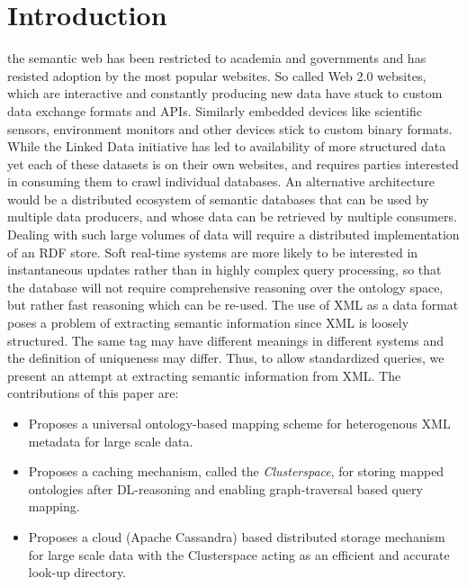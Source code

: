 \documentclass[journal]{IEEEtran}
\begin{document}
\section{Introduction}
 the semantic web has been restricted to academia
and governments and has resisted adoption by the most popular websites. So
called Web 2.0 websites, which are interactive and constantly producing new
data have stuck to custom data exchange formats and APIs. Similarly embedded
devices like scientific sensors, environment monitors and other devices stick
to custom binary formats.  While the Linked Data initiative has led to
availability of more structured data yet each of these datasets is on their own
websites, and requires parties interested in consuming them to crawl individual
databases. An alternative architecture would be a distributed ecosystem of
semantic databases that can be used by multiple data producers, and whose data
can be retrieved by multiple consumers. Dealing with such large volumes of data
will require a distributed implementation of an RDF store. Soft real-time
systems are more likely to be interested in instantaneous updates rather than
in highly complex query processing, so that the database will not require
comprehensive reasoning over the ontology space, but rather fast reasoning
which can be re-used. The use of XML as a data format poses a problem of
extracting semantic information since XML is loosely structured. The same tag
may have different meanings in different systems and the definition of
uniqueness may differ. Thus, to allow standardized queries, we present an
attempt at extracting semantic information from XML. The contributions of this
paper are:

\begin{itemize}
    \item Proposes a universal ontology-based mapping scheme for heterogenous
        XML metadata for large scale data.

    \item Proposes a caching mechanism, called the \emph{Clusterspace}, for
        storing mapped ontologies after DL-reasoning and enabling
        graph-traversal based query mapping.

    \item Proposes a cloud (Apache Cassandra) based distributed storage
        mechanism for large scale data with the Clusterspace acting as an
        efficient and accurate look-up directory.

\end{itemize}
\end{document}
